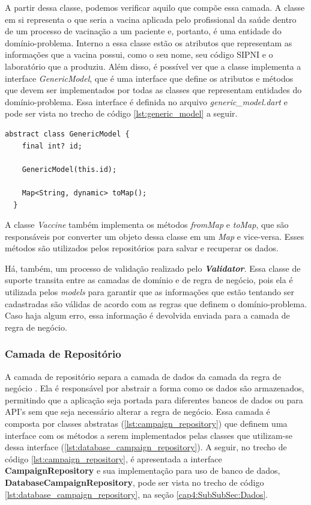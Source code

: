 A partir dessa classe, podemos verificar aquilo que compõe essa camada. A classe em si representa o que seria a vacina aplicada pelo profissional da saúde dentro de um processo de vacinação a um paciente e, portanto, é uma entidade do domínio-problema. Interno a essa classe estão os atributos que representam as informações que a vacina possui, como o seu nome, seu código SIPNI e o laboratório que a produziu. Além disso, é possível ver que a classe implementa a interface \textit{GenericModel}, que é uma interface que define os atributos e métodos que devem ser implementados por todas as classes que representam entidades do domínio-problema. Essa interface é definida no arquivo \textit{generic\_model.dart} e pode ser vista no trecho de código \ref{lst:generic_model} a seguir.

\begin{lstlisting}[caption={Interface \textbf{GenericModel}}, label={lst:generic_model}]
  abstract class GenericModel {
    final int? id;
  
    GenericModel(this.id);
  
    Map<String, dynamic> toMap();
  }
\end{lstlisting}

A classe \textit{Vaccine} também implementa os métodos \textit{fromMap} e \textit{toMap}, que são responsáveis por converter um objeto dessa classe em um \textit{Map} e vice-versa. Esses métodos são utilizados pelos repositórios para salvar e recuperar os dados.

Há, também, um processo de validação realizado pelo \textbf{\textit{Validator}}. Essa classe de suporte transita entre as camadas de domínio e de regra de negócio, pois ela é utilizada pelos \textit{models} para garantir que as informações que estão tentando ser cadastradas são válidas de acordo com as regras que definem o domínio-problema. Caso haja algum erro, essa informação é devolvida enviada para a camada de regra de negócio.

\subsubsection{Camada de Repositório}
\label{cap4:SubSubSec:Repositorio}

A camada de repositório separa a camada de dados da camada da regra de negócio \cite{Faust2020} \cite{andrea_repositories}. Ela é responsável por abstrair a forma como os dados são armazenados, permitindo que a aplicação seja portada para diferentes bancos de dados ou para API's sem que seja necessário alterar a regra de negócio. Essa camada é composta por classes abstratas (\ref{lst:campaign_repository}) que definem uma interface com os métodos a serem implementados pelas classes que utilizam-se dessa interface (\ref{lst:database_campaign_repository}). A seguir, no trecho de código \ref{lst:campaign_repository}, é apresentada a interface \textbf{CampaignRepository} e sua implementação para uso de banco de dados, \textbf{DatabaseCampaignRepository}, pode ser vista no trecho de código \ref{lst:database_campaign_repository}, na seção \ref{cap4:SubSubSec:Dados}.

